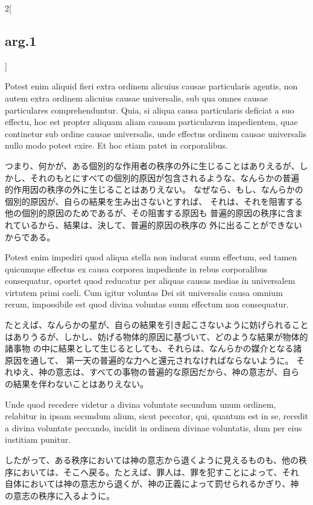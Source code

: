 \documentclass[paper=a4paper,fontsize=10pt,jafontsize=9pt,titlepage]{jlreq}
\begin{document}
\begin{paracol}{2}[\subsection{arg.1}]
\switchcolumn*


Potest
enim aliquid fieri extra ordinem alicuius causae particularis agentis,
non autem extra ordinem alicuius causae universalis, sub qua omnes
causae particulares comprehenduntur. Quia, si aliqua causa particularis
deficiat a suo effectu, hoc est propter aliquam aliam causam
particularem impedientem, quae continetur sub ordine causae universalis,
unde effectus ordinem causae universalis nullo modo potest exire. Et hoc
etiam patet in corporalibus.

\switchcolumn

つまり、何かが、ある個別的な作用者の秩序の外に生じることはありえるが、し
 かし、それのもとにすべての個別的原因が包含されるような、なんらかの普遍
 的作用因の秩序の外に生じることはありえない。
なぜなら、もし、なんらかの個別的原因が、自らの結果を生み出さないとすれば、
 それは、それを阻害する他の個別的原因のためであるが、その阻害する原因も
 普遍的原因の秩序に含まれているから、結果は、決して、普遍的原因の秩序の
 外に出ることができないからである。

\switchcolumn*


Potest enim impediri quod aliqua stella non
inducat suum effectum, sed tamen quicumque effectus ex causa corporea
impediente in rebus corporalibus consequatur, oportet quod reducatur per
aliquas causas medias in universalem virtutem primi caeli. Cum igitur
voluntas Dei sit universalis causa omnium rerum, impossibile est quod
divina voluntas suum effectum non consequatur.

\switchcolumn

たとえば、なんらかの星が、自らの結果を引き起こさないように妨げられること
 はありうるが、しかし、妨げる物体的原因に基づいて、どのような結果が物体的諸事物
 の中に結果として生じるとしても、それらは、なんらかの媒介となる諸原因を通して、
 第一天の普遍的な力へと還元されなければならないように。
それゆえ、神の意志は、すべての事物の普遍的な原因だから、神の意志が、自ら
 の結果を伴わないことはありえない。

\switchcolumn*


Unde quod recedere
videtur a divina voluntate secundum unum ordinem, relabitur in ipsam
secundum alium, sicut peccator, qui, quantum est in se, recedit a divina
voluntate peccando, incidit in ordinem divinae voluntatis, dum per eius
iustitiam punitur.

\switchcolumn

したがって、ある秩序においては神の意志から退くように見えるものも、他の秩
 序においては、そこへ戻る。たとえば、罪人は、罪を犯すことによって、それ
 自体においては神の意志から退くが、神の正義によって罰せられるかぎり、神
 の意志の秩序に入るように。


\end{paracol}
\end{document}
